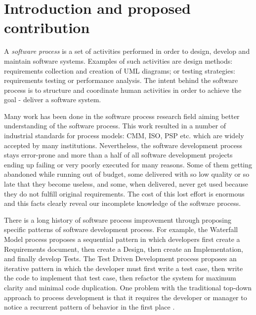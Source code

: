 \chapter{Introduction and proposed contribution}
A \textit{software process} is a set of activities performed in order to design, develop and maintain software systems. Examples of such activities are design methods: requirements collection and creation of UML diagrams; or testing strategies: requirements testing or performance analysis. The intent behind the software process is to structure and coordinate human activities in order to achieve the goal - deliver a software system.

Many work has been done in the software process research field aiming better understanding of the software process. This work resulted in a number of industrial standards for process models: CMM, ISO, PSP etc. \cite{citeulike:5043104} which are widely accepted by many institutions. Nevertheless, the software development process stays error-prone and more than a half of all software development projects ending up failing or very poorly executed for many reasons. Some of them getting abandoned while running out of budget, some delivered with so low quality or so late that they become useless, and some, when delivered, never get used because they do not fulfill original requirements. The cost of this lost effort is enormous and this facts clearly reveal our incomplete knowledge of the software process.

There is a long history of software process improvement through proposing specific patterns of software development process. For example, the Waterfall Model process proposes a sequential pattern in which developers first create a Requirements document, then create a Design, then create an Implementation, and finally develop Tests. The Test Driven Development process proposes an iterative pattern in which the developer must first write a test case, then write the code to implement that test case, then refactor the system for maximum clarity and minimal code duplication. One problem with the traditional top-down approach to process development is that it requires the developer or manager to notice a recurrent pattern of behavior in the first place \cite{citeulike:5043104}. 

